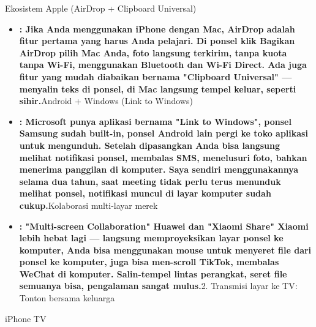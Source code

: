 


Ekosistem Apple (AirDrop + Clipboard Universal)

\begin{itemize}
  \item \textbf{: Jika Anda menggunakan iPhone dengan Mac, AirDrop adalah fitur pertama yang harus Anda pelajari. Di ponsel klik Bagikan AirDrop pilih Mac Anda, foto langsung terkirim, tanpa kuota tanpa Wi-Fi, menggunakan Bluetooth dan Wi-Fi Direct. Ada juga fitur yang mudah diabaikan bernama "Clipboard Universal" — menyalin teks di ponsel, di Mac langsung tempel keluar, seperti sihir.}Android + Windows (Link to Windows)
  \item \textbf{: Microsoft punya aplikasi bernama "Link to Windows", ponsel Samsung sudah built-in, ponsel Android lain pergi ke toko aplikasi untuk mengunduh. Setelah dipasangkan Anda bisa langsung melihat notifikasi ponsel, membalas SMS, menelusuri foto, bahkan menerima panggilan di komputer. Saya sendiri menggunakannya selama dua tahun, saat meeting tidak perlu terus menunduk melihat ponsel, notifikasi muncul di layar komputer sudah cukup.}Kolaborasi multi-layar merek
  \item \textbf{: "Multi-screen Collaboration" Huawei dan "Xiaomi Share" Xiaomi lebih hebat lagi — langsung memproyeksikan layar ponsel ke komputer, Anda bisa menggunakan mouse untuk menyeret file dari ponsel ke komputer, juga bisa men-scroll TikTok, membalas WeChat di komputer. Salin-tempel lintas perangkat, seret file semuanya bisa, pengalaman sangat mulus.}2. Transmisi layar ke TV: Tonton bersama keluarga
\end{itemize}


iPhone TV

